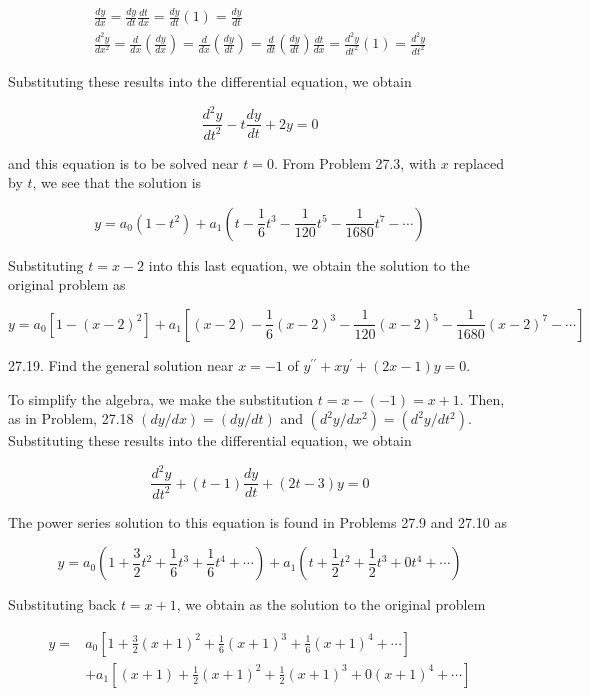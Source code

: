 \documentclass[10pt]{article}
\begin{document}
$$
\begin{gathered}
\frac{d y}{d x}=\frac{d y}{d t} \frac{d t}{d x}=\frac{d y}{d t}(1)=\frac{d y}{d t} \\
\frac{d^{2} y}{d x^{2}}=\frac{d}{d x}\left(\frac{d y}{d x}\right)=\frac{d}{d x}\left(\frac{d y}{d t}\right)=\frac{d}{d t}\left(\frac{d y}{d t}\right) \frac{d t}{d x}=\frac{d^{2} y}{d t^{2}}(1)=\frac{d^{2} y}{d t^{2}}
\end{gathered}
$$

Substituting these results into the differential equation, we obtain

$$
\frac{d^{2} y}{d t^{2}}-t \frac{d y}{d t}+2 y=0
$$

and this equation is to be solved near $t=0$. From Problem 27.3, with $x$ replaced by $t$, we see that the solution is

$$
y=a_{0}\left(1-t^{2}\right)+a_{1}\left(t-\frac{1}{6} t^{3}-\frac{1}{120} t^{5}-\frac{1}{1680} t^{7}-\cdots\right)
$$

Substituting $t=x-2$ into this last equation, we obtain the solution to the original problem as


\begin{equation*}
y=a_{0}\left[1-(x-2)^{2}\right]+a_{1}\left[(x-2)-\frac{1}{6}(x-2)^{3}-\frac{1}{120}(x-2)^{5}-\frac{1}{1680}(x-2)^{7}-\cdots\right] \tag{1}
\end{equation*}


27.19. Find the general solution near $x=-1$ of $y^{\prime \prime}+x y^{\prime}+(2 x-1) y=0$.

To simplify the algebra, we make the substitution $t=x-(-1)=x+1$. Then, as in Problem, 27.18 $(d y / d x)=(d y / d t)$ and $\left(d^{2} y / d x^{2}\right)=\left(d^{2} y / d t^{2}\right)$. Substituting these results into the differential equation, we obtain

$$
\frac{d^{2} y}{d t^{2}}+(t-1) \frac{d y}{d t}+(2 t-3) y=0
$$

The power series solution to this equation is found in Problems 27.9 and 27.10 as

$$
y=a_{0}\left(1+\frac{3}{2} t^{2}+\frac{1}{6} t^{3}+\frac{1}{6} t^{4}+\cdots\right)+a_{1}\left(t+\frac{1}{2} t^{2}+\frac{1}{2} t^{3}+0 t^{4}+\cdots\right)
$$

Substituting back $t=x+1$, we obtain as the solution to the original problem


\begin{align*}
y= & a_{0}\left[1+\frac{3}{2}(x+1)^{2}+\frac{1}{6}(x+1)^{3}+\frac{1}{6}(x+1)^{4}+\cdots\right] \\
& +a_{1}\left[(x+1)+\frac{1}{2}(x+1)^{2}+\frac{1}{2}(x+1)^{3}+0(x+1)^{4}+\cdots\right] \tag{1}
\end{align*}
\end{document}
